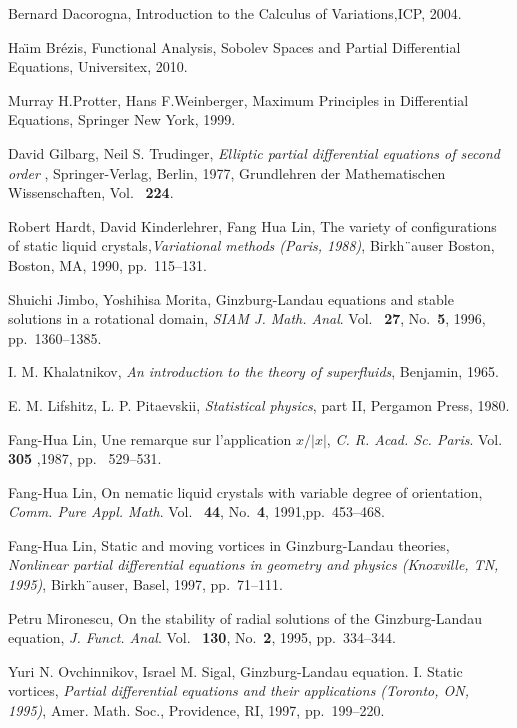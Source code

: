 \begin{thebibliography}{99}
  Bernard Dacorogna, Introduction to the Calculus of Variations,ICP, 2004.

  Ha\"ım Br\'ezis, Functional Analysis, Sobolev Spaces and Partial Differential Equations, Universitex, 2010.

 Murray H.Protter, Hans F.Weinberger, Maximum Principles in Differential Equations, Springer New York, 1999. 

David Gilbarg, Neil S. Trudinger, {\it Elliptic partial differential equations of second order} ,
Springer-Verlag, Berlin, 1977, Grundlehren der Mathematischen Wissenschaften, Vol.~ {\bf 224}.

Robert Hardt, David Kinderlehrer, Fang Hua Lin, The variety of configurations of static
liquid crystals,{\it Variational methods (Paris, 1988)}, Birkh¨auser Boston, Boston, MA,
1990,  pp.~115–131.

Shuichi Jimbo, Yoshihisa Morita, Ginzburg-Landau equations and stable solutions in a
rotational domain, {\it SIAM J. Math. Anal}. Vol.~ {\bf 27}, No.~{\bf 5}, 1996, pp.~1360–1385.

I. M. Khalatnikov, {\it An introduction to the theory of superfluids}, Benjamin, 1965.

E. M. Lifshitz, L. P. Pitaevskii, {\it Statistical physics}, part II, Pergamon Press, 1980.

Fang-Hua Lin, Une remarque sur l’application $x/|x|$, {\it C. R. Acad. Sc. Paris}. Vol.~ {\bf 305} ,1987,
 pp.~ 529–531.

Fang-Hua Lin, On nematic liquid crystals with variable degree of orientation, {\it Comm.
Pure Appl. Math}. Vol.~ {\bf 44}, No.~{\bf 4}, 1991,pp.~453–468.

Fang-Hua Lin, Static and moving vortices in Ginzburg-Landau theories, {\it Nonlinear partial
differential equations in geometry and physics (Knoxville, TN, 1995)}, Birkh¨auser,
Basel, 1997, pp.~71–111.

Petru Mironescu, On the stability of radial solutions of the Ginzburg-Landau equation,
{\it J. Funct. Anal}. Vol.~ {\bf 130}, No.~{\bf 2},  1995, pp.~334–344.

Yuri N. Ovchinnikov, Israel M. Sigal,  Ginzburg-Landau equation. I. Static vortices,
{\it Partial differential equations and their applications (Toronto, ON, 1995)}, Amer. Math.
Soc., Providence, RI, 1997, pp.~199–220.


\end{thebibliography}
